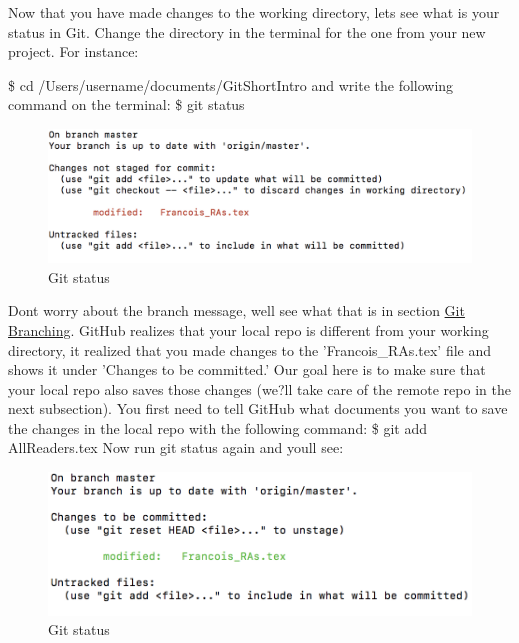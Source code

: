 \documentclass[12pt]{article}
\begin{document}
    Now that you have made changes to the working directory, let\textquotesingle s see what is your status in Git. Change the directory in the terminal for the one from your new project. For instance:
    
    \vspace{0.1 in}
    \indent \$ cd /Users/username/documents/GitShortIntro
    \newline
    \newline
    and write the following command on the terminal:
    \newline
    \newline
    \indent \$ git status
    \begin{figure}[h]
	\caption{Git status}
	\includegraphics[scale=0.5]{figure2}
	\centering
    \end{figure}
    \vspace{0.1 in}
    Don\textquotesingle t worry about the branch message, we\textquotesingle ll see what that is in section \hyperref[sec:branching]{Git Branching}. GitHub realizes that your local repo is different from your working directory, it realized that you made changes to the 'Francois\_RAs.tex' file and shows it under 'Changes to be committed.' Our goal here is to make sure that your local repo also saves those changes (we?ll take care of the remote repo in the next subsection). You first need to tell GitHub what documents you want to save the changes in the local repo with the following command:
    \newline
    \newline
    \indent \$ git add AllReaders.tex
    \newline
    \newline
    Now run git status again and you\textquotesingle ll see:
    \newline
    \begin{figure}[h]
	\caption{Git status}
	\includegraphics[scale=0.5]{figure3}
	\centering
    \end{figure}
    \vspace{0.1 in}
\end{document}
